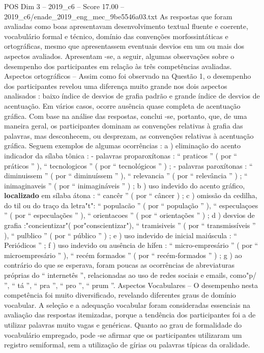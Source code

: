 \begin{textsample}{POS Dim 3 – 2019\_c6 – Score 17.00 – 2019\_c6/enade\_2019\_eng\_mec\_9be5546a03.txt}
As respostas que foram avaliadas como boas apresentavam desenvolvimento textual fluente e coerente, vocabulário formal e técnico, domínio das convenções morfossintáticas e ortográficas, mesmo que apresentassem eventuais desvios em um ou mais dos aspectos avaliados.
Apresentam -se, a seguir, algumas observações sobre o desempenho dos participantes em relação às três competências avaliadas.
Aspectos ortográficos – Assim como foi observado na Questão 1, o desempenho dos participantes revelou uma diferença muito grande nos dois aspectos analisados : baixo índice de desvios de grafia padrão e grande índice de desvios de acentuação.
Em vários casos, ocorre ausência quase completa de acentuação gráfica.
Com base na análise das respostas, conclui -se, portanto, que, de uma maneira geral, os participantes dominam as convenções relativas à grafia das palavras, mas desconhecem, ou desprezam, as convenções relativas à acentuação gráfica.
Seguem exemplos de algumas ocorrências : a ) eliminação do acento indicador da sílaba tônica : - palavras proparoxítonas : “ praticos ” ( por “ práticos ” ), “ tecnologicos ” ( por “ tecnológicos ” ) ; - palavras paroxítonas : “ diminuissem ” ( por “ diminuíssem ” ), “ relevancia ” ( por “ relevância ” ) ; “ inimaginaveis ” ( por “ inimagináveis ” ) ; b ) uso indevido do acento gráfico, \textbf{localizado} em sílaba átona : “ cancêr ” ( por “ câncer ) ; c ) omissão da cedilha, do til ou do traço da letra"t": “ populacão ” ( por “ população ” ), “ especulaçoes ” ( por “ especulações ” ), “ orientacoes ” ( por “ orientações ” ) ; d ) desvios de grafia :"concientizar"( por"conscientizar"), “ tramisiveis ” ( por “ transmissíveis ” ), “ pulblico ” ( por “ público ” ) ; e ) uso indevido de inicial maiúscula : “ Periódicos ” ; f ) uso indevido ou ausência de hífen : “ micro-empresário ” ( por “ microempresário ” ), “ recém formados ” ( por “ recém-formados ” ) ; g ) ao contrário do que se esperava, foram poucas as ocorrências de abreviaturas próprias do “ internetês ”, relacionadas ao uso de redes sociais e emails, como"p/ ”, “ tá ”, “ pra ”, “ pro ”, “ prum ”.
Aspectos Vocabulares – O desempenho nesta competência foi muito diversificado, revelando diferentes graus de domínio vocabular.
A seleção e a adequação vocabular foram consideradas essenciais na avaliação das respostas itemizadas, porque a tendência dos participantes foi a de utilizar palavras muito vagas e genéricas.
Quanto ao grau de formalidade do vocabulário empregado, pode -se afirmar que os participantes utilizaram um registro semiformal, sem a utilização de gírias ou palavras típicas da oralidade.

\end{textsample}
